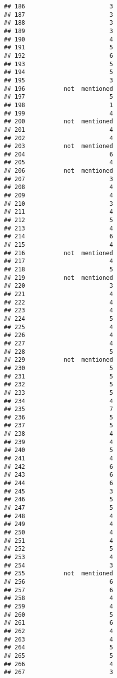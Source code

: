\documentclass[
]{article}
\begin{document}
\begin{verbatim}
## 186                        3
## 187                        3
## 188                        3
## 189                        3
## 190                        4
## 191                        5
## 192                        6
## 193                        5
## 194                        5
## 195                        3
## 196           not  mentioned
## 197                        5
## 198                        1
## 199                        4
## 200           not  mentioned
## 201                        4
## 202                        4
## 203           not  mentioned
## 204                        6
## 205                        4
## 206           not  mentioned
## 207                        3
## 208                        4
## 209                        4
## 210                        3
## 211                        4
## 212                        5
## 213                        4
## 214                        6
## 215                        4
## 216           not  mentioned
## 217                        4
## 218                        5
## 219           not  mentioned
## 220                        3
## 221                        4
## 222                        4
## 223                        4
## 224                        5
## 225                        4
## 226                        4
## 227                        4
## 228                        5
## 229           not  mentioned
## 230                        5
## 231                        5
## 232                        5
## 233                        5
## 234                        4
## 235                        7
## 236                        5
## 237                        5
## 238                        4
## 239                        4
## 240                        5
## 241                        4
## 242                        6
## 243                        6
## 244                        6
## 245                        3
## 246                        5
## 247                        5
## 248                        4
## 249                        4
## 250                        4
## 251                        4
## 252                        5
## 253                        4
## 254                        3
## 255           not  mentioned
## 256                        6
## 257                        6
## 258                        4
## 259                        4
## 260                        5
## 261                        6
## 262                        4
## 263                        4
## 264                        5
## 265                        5
## 266                        4
## 267                        3

\end{verbatim}
\end{document}
